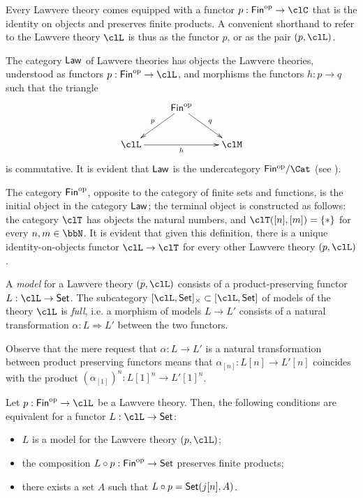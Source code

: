 \documentclass{amsart}
\begin{document}
Every Lawvere theory comes equipped with a functor $p : \cate{Fin}^\op \to \clC$ that is the identity on objects and preserves finite products. A convenient shorthand to refer to the Lawvere theory $\clL$ is thus as the functor $p$, or as the pair $(p,\clL)$.
\begin{definition}
  The category $\mathsf{Law}$ of Lawvere theories has objects the Lawvere theories, understood as functors $p : \cate{Fin}^\op \to \clL$, and morphisms the functors $h :  p\to q$ such that the triangle 
  \[\xymatrix{
    & \cate{Fin}^\op \ar[dr]^q \ar[dl]_p & \\ 
    \clL \ar[rr]_h && \clM 
  }\]
  is commutative. It is evident that $\mathsf{Law}$ is the undercategory $\cate{Fin^\op}/\Cat$ (see \cite[]{}).
\end{definition}
\begin{example}
The category $\mathsf{Fin}^{\text{op}}$, opposite to the category of finite sets and functions, is the initial object in the category  $\mathsf{Law}$; the terminal object is constructed as follows: the category $\clT$ has objects the natural numbers, and $\clT([n],[m])=\{*\}$ for every $n,m\in \bbN$. It is evident that given this definition, there is a unique identity-on-objects functor $\clL \to \clT$ for every other Lawvere theory $(p,\clL)$.
\end{example}
\begin{definition}
    A \emph{model} for a Lawvere theory $(p ,\clL)$ consists of a product-preserving functor $L : \clL \to \Set$. The subcategory $[\clL,\Set]_\times \subset [\clL, \Set]$ of models of the theory $\clL$ is \emph{full}, i.e. a morphism of models $L \to L'$ consists of a natural transformation $\alpha : L \Rightarrow L'$ between the two functors.
\end{definition}
Observe that the mere request that $\alpha : L \to L'$ is a natural transformation between product preserving functors means that $\alpha_{[n]} : L[n] \to L'[n]$ coincides with the product $(\alpha_{[1]})^n : L[1]^n \to L'[1]^n$.
\begin{proposition}
  Let $p : \cate{Fin}^\op\to \clL$ be a Lawvere theory. Then, the following conditions are equivalent for a functor $L : \clL \to \Set$:
  \begin{itemize}
    \item $L$ is a model for the Lawvere theory $(p,\clL)$;
    \item the composition $L\circ p : \mathsf{Fin}^{\text{op}} \to \mathsf{Set}$ preserves finite products;
    \item there exists a set $A$ such that $L\circ p = \mathsf{Set}(j[n],A)$.
  \end{itemize}
\end{proposition}
\end{document}
